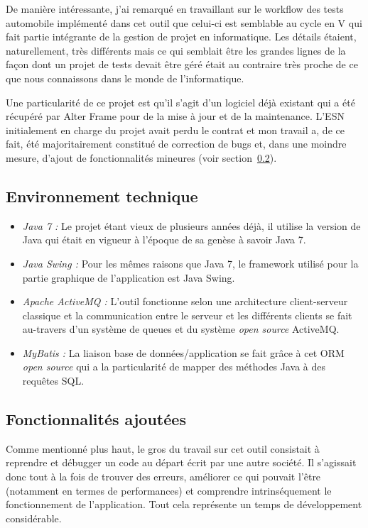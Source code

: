 De manière intéressante, j'ai remarqué en travaillant sur le workflow des tests automobile implémenté dans cet outil que celui-ci est semblable au cycle en V qui fait partie intégrante de la gestion de projet en informatique. Les détails étaient, naturellement, très différents mais ce qui semblait être les grandes lignes de la façon dont un projet de tests devait être géré était au contraire très proche de ce que nous connaissons dans le monde de l'informatique.

Une particularité de ce projet est qu'il s'agit d'un logiciel déjà existant qui a été récupéré par Alter Frame pour de la mise à jour et de la maintenance. L'ESN initialement en charge du projet avait perdu le contrat et mon travail a, de ce fait, été majoritairement constitué de correction de bugs et, dans une moindre mesure, d'ajout de fonctionnalités mineures (voir section~\ref{subsec:ajout}).

\subsection{Environnement technique}
\begin{itemize}
	\item \emph{Java 7 :} Le projet étant vieux de plusieurs années déjà, il utilise la version de Java qui était en vigueur à l'époque de sa genèse à savoir Java 7.
	\item \emph{Java Swing\cite{swing_wiki} :} Pour les mêmes raisons que Java 7, le framework utilisé pour la partie graphique de l'application est Java Swing.
	\item \emph{Apache ActiveMQ\cite{activemq} :} L'outil fonctionne selon une architecture client-serveur classique et la communication entre le serveur et les différents clients se fait au-travers d'un système de queues et du système \textit{open source} ActiveMQ.
	\item \emph{MyBatis\cite{mybatis} :} La liaison base de données/application se fait grâce à cet ORM \textit{open source} qui a la particularité de mapper des méthodes Java à des requêtes SQL\cite{mybatis_prez}.
\end{itemize}

\subsection{Fonctionnalités ajoutées}
\label{subsec:ajout}
Comme mentionné plus haut, le gros du travail sur cet outil consistait à reprendre et débugger un code au départ écrit par une autre société. Il s'agissait donc tout à la fois de trouver des erreurs, améliorer ce qui pouvait l'être (notamment en termes de performances) et comprendre intrinséquement le fonctionnement de l'application. Tout cela représente un temps de développement considérable.

